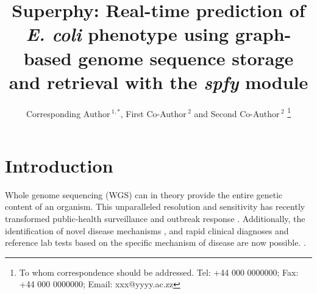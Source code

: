 \documentclass[a4,center,fleqn]{NAR}
\begin{document}
\title{Superphy: Real-time prediction of \textit{E. coli} phenotype using graph-based genome sequence storage and retrieval with the \textit{spfy} module}

\author{%
Corresponding Author\,$^{1,*}$,
First Co-Author\,$^{2}$
and Second Co-Author\,$^2$%
\footnote{To whom correspondence should be addressed.
Tel: +44 000 0000000; Fax: +44 000 0000000; Email: xxx@yyyy.ac.zz}}

\address{%
$^{1}$Affiliation of Corresponding Author
and
$^{2}$Affiliation of Both Co-Authors}


\maketitle

\begin{abstract}

\end{abstract}


\section{Introduction}

Whole genome sequencing (WGS) can in theory provide the entire genetic content of an organism. This unparalleled resolution and sensitivity has recently transformed public-health surveillance and outbreak response \cite{ronholm2016navigating,lytsy2017time}. Additionally, the identification of novel disease mechanisms \cite{wang2014whole,yuen2015whole}, and rapid clinical diagnoses and reference lab tests based on the specific mechanism of disease are now possible. \cite{willig2015whole,dewey2014clinical}.
\end{document}
